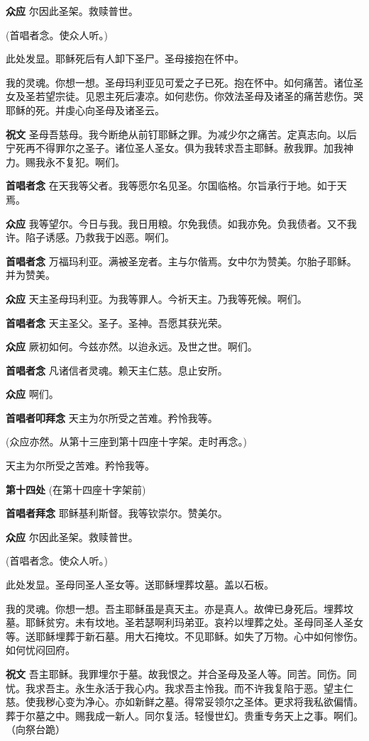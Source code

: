\documentclass[UTF8,17pt]{ctexart}
\begin{document}
\textbf{众应} \quad 尔因此圣架。救赎普世。

(⾸唱者念。使众⼈听。)

此处发显。耶稣死后有⼈卸下圣⼫。圣母接抱在怀中。

我的灵魂。你想⼀想。圣母玛利亚见可爱之⼦已死。抱在怀中。如何痛苦。诸位圣⼥及圣若望宗徒。见恩主死后凄凉。如何悲伤。你效法圣母及诸圣的痛苦悲伤。哭耶稣的死。并虔⼼向圣母及诸圣云。

\textbf{祝⽂} \quad 圣母吾慈母。我今断绝从前钉耶稣之罪。为减少尔之痛苦。定真志向。以后宁死再不得罪尔之圣⼦。诸位圣⼈圣⼥。俱为我转求吾主耶稣。赦我罪。加我神⼒。赐我永不复犯。啊们。

\textbf{⾸唱者念} \quad 在天我等⽗者。我等愿尔名见圣。尔国临格。尔旨承⾏于地。如于天焉。

\textbf{众应} \quad 我等望尔。今⽇与我。我⽇⽤粮。尔免我债。如我亦免。负我债者。又不我许。陷⼦诱感。乃救我于凶恶。啊们。

\textbf{⾸唱者念} \quad 万福玛利亚。满被圣宠者。主与尔偕焉。⼥中尔为赞美。尔胎⼦耶稣。并为赞美。

\textbf{众应} \quad 天主圣母玛利亚。为我等罪⼈。今祈天主。乃我等死候。啊们。

\textbf{⾸唱者念} \quad 天主圣⽗。圣⼦。圣神。吾愿其获光荣。

\textbf{众应} \quad 厥初如何。今兹亦然。以迨永远。及世之世。啊们。

\textbf{⾸唱者念} \quad 凡诸信者灵魂。赖天主仁慈。息⽌安所。

\textbf{众应} \quad 啊们。


\textbf{⾸唱者叩拜念} \quad 天主为尔所受之苦难。矜怜我等。

(众应亦然。从第十三座到第十四座⼗字架。⾛时再念。)

天主为尔所受之苦难。矜怜我等。

\textbf{第十四处} (在第十四座⼗字架前)

\textbf{⾸唱者拜念} \quad 耶稣基利斯督。我等钦崇尔。赞美尔。

\textbf{众应} \quad 尔因此圣架。救赎普世。

(⾸唱者念。使众⼈听。)

此处发显。圣母同圣⼈圣⼥等。送耶稣埋葬坟墓。盖以⽯板。

我的灵魂。你想⼀想。吾主耶稣虽是真天主。亦是真⼈。故俾已⾝死后。埋葬坟墓。耶稣贫穷。未有坟地。圣若瑟啊利玛弟亚。哀衿以埋葬之处。圣母同圣⼈圣⼥等。送耶稣埋葬于新⽯墓。⽤⼤⽯掩坟。不见耶稣。如失了万物。⼼中如何惨伤。如何忧闷回府。

\textbf{祝⽂} \quad 吾主耶稣。我罪埋尔于墓。故我恨之。并合圣母及圣⼈等。同苦。同伤。同忧。我求吾主。永⽣永活于我⼼内。我求吾主怜我。⽽不许我复陷于恶。望主仁慈。使我秽⼼变为净⼼。亦如新鲜之墓。得常妥领尔之圣体。更求将我私欲偏情。葬于尔墓之中。赐我成⼀新⼈。同尔复活。轻慢世幻。贵重专务天上之事。啊们。（向祭台跪）
\end{document}
